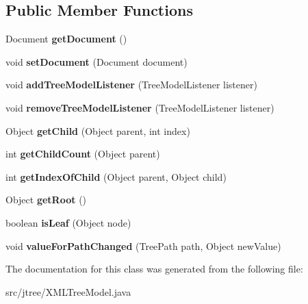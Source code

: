 \subsection*{Public Member Functions}
\begin{DoxyCompactItemize}
\item 
\hypertarget{classjtree_1_1_x_m_l_tree_model_a8dee354e383082229278c2141dfded53}{Document {\bfseries get\+Document} ()}\label{classjtree_1_1_x_m_l_tree_model_a8dee354e383082229278c2141dfded53}

\item 
\hypertarget{classjtree_1_1_x_m_l_tree_model_adcae1a6b8e5e922e0f99909c209659c3}{void {\bfseries set\+Document} (Document document)}\label{classjtree_1_1_x_m_l_tree_model_adcae1a6b8e5e922e0f99909c209659c3}

\item 
\hypertarget{classjtree_1_1_x_m_l_tree_model_a33f7d534b268f662104f387dca6edaab}{void {\bfseries add\+Tree\+Model\+Listener} (Tree\+Model\+Listener listener)}\label{classjtree_1_1_x_m_l_tree_model_a33f7d534b268f662104f387dca6edaab}

\item 
\hypertarget{classjtree_1_1_x_m_l_tree_model_af2b56c2a14f7b7e7b5975fae75331c68}{void {\bfseries remove\+Tree\+Model\+Listener} (Tree\+Model\+Listener listener)}\label{classjtree_1_1_x_m_l_tree_model_af2b56c2a14f7b7e7b5975fae75331c68}

\item 
\hypertarget{classjtree_1_1_x_m_l_tree_model_afc6f7bf08e56ddf71b42e64d628f2550}{Object {\bfseries get\+Child} (Object parent, int index)}\label{classjtree_1_1_x_m_l_tree_model_afc6f7bf08e56ddf71b42e64d628f2550}

\item 
\hypertarget{classjtree_1_1_x_m_l_tree_model_a99f4b31d62c1680aaf5d192292f36c40}{int {\bfseries get\+Child\+Count} (Object parent)}\label{classjtree_1_1_x_m_l_tree_model_a99f4b31d62c1680aaf5d192292f36c40}

\item 
\hypertarget{classjtree_1_1_x_m_l_tree_model_a2f17f6ab3e60f455eb26dbf946509224}{int {\bfseries get\+Index\+Of\+Child} (Object parent, Object child)}\label{classjtree_1_1_x_m_l_tree_model_a2f17f6ab3e60f455eb26dbf946509224}

\item 
\hypertarget{classjtree_1_1_x_m_l_tree_model_a8a52ad6dc77d41ebc615968bf8318fd9}{Object {\bfseries get\+Root} ()}\label{classjtree_1_1_x_m_l_tree_model_a8a52ad6dc77d41ebc615968bf8318fd9}

\item 
\hypertarget{classjtree_1_1_x_m_l_tree_model_ae23daf4264ddddc31a92f77962a233df}{boolean {\bfseries is\+Leaf} (Object node)}\label{classjtree_1_1_x_m_l_tree_model_ae23daf4264ddddc31a92f77962a233df}

\item 
\hypertarget{classjtree_1_1_x_m_l_tree_model_ad111c833197734e1f3cbc98258c4f54d}{void {\bfseries value\+For\+Path\+Changed} (Tree\+Path path, Object new\+Value)}\label{classjtree_1_1_x_m_l_tree_model_ad111c833197734e1f3cbc98258c4f54d}

\end{DoxyCompactItemize}


The documentation for this class was generated from the following file\+:\begin{DoxyCompactItemize}
\item 
src/jtree/X\+M\+L\+Tree\+Model.\+java\end{DoxyCompactItemize}

